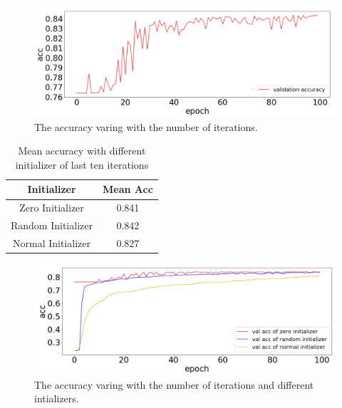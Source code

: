 \documentclass[journal, a4paper]{IEEEtran}
\begin{document}
	\begin{figure}[!hbt]
		\begin{center}
		\includegraphics[width=\columnwidth]{svm2}
		\caption{The accuracy varing with the number of iterations.}
		\label{fig:svm2}
		\end{center}
	\end{figure}

	\begin{table}[!hbt]
		\begin{center}
		\caption{Mean accuracy with different initializer of last ten iterations}
		\label{tab:lossInitial1}
		\begin{tabular}{|c|c|}
			\hline
			Initializer & Mean Acc \\
			\hline
			Zero Initializer & 0.841 \\
			\hline
			Random Initializer & 0.842 \\
			\hline
			Normal Initializer & 0.827 \\
			\hline
		\end{tabular}
		\end{center}
	\end{table}

	\begin{figure}[!hbt]
		\begin{center}
		\includegraphics[width=\columnwidth]{svm3}
		\caption{The accuracy varing with the number of iterations and different intializers.}
		\label{fig:svm3}
		\end{center}
	\end{figure}
	
\end{document}
